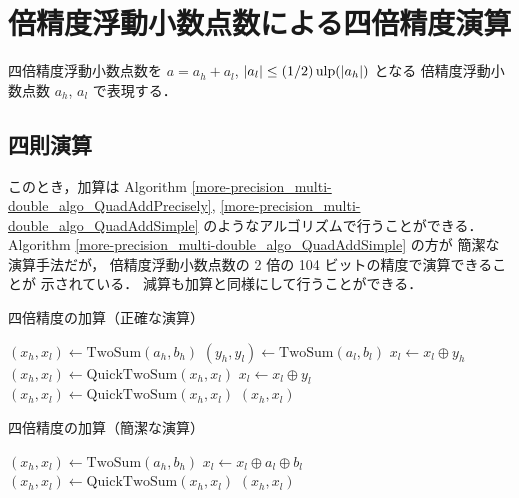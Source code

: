\clearpage

\section{倍精度浮動小数点数による四倍精度演算}

四倍精度浮動小数点数を $a = a_h + a_l$, $|a_l| \le (1/2) \operatorname{ulp}(|a_h|)$ となる
倍精度浮動小数点数 $a_h$, $a_l$ で表現する．

\subsection{四則演算}

このとき，加算は
Algorithm \ref{more-precision_multi-double_algo_QuadAddPrecisely},
\ref{more-precision_multi-double_algo_QuadAddSimple}
のようなアルゴリズムで行うことができる．
Algorithm \ref{more-precision_multi-double_algo_QuadAddSimple} の方が
簡潔な演算手法だが，
倍精度浮動小数点数の 2 倍の 104 ビットの精度で演算できることが
示されている\cite{Naoya2012}．
減算も加算と同様にして行うことができる．

\begin{algorithm}[tp]
    \caption{四倍精度の加算（正確な演算）\cite{Hisashi2006}}
    \label{more-precision_multi-double_algo_QuadAddPrecisely}
    \begin{algorithmic}[1]
        \State $(x_h, x_l) \gets \text{TwoSum}(a_h, b_h)$
        \State $(y_h, y_l) \gets \text{TwoSum}(a_l, b_l)$
        \State $x_l \gets x_l \oplus y_h$
        \State $(x_h, x_l) \gets \text{QuickTwoSum}(x_h, x_l)$
        \State $x_l \gets x_l \oplus y_l$
        \State $(x_h, x_l) \gets \text{QuickTwoSum}(x_h, x_l)$
        \State \Return $(x_h, x_l)$
        \EndProcedure
    \end{algorithmic}
\end{algorithm}

\begin{algorithm}[tp]
    \caption{四倍精度の加算（簡潔な演算）\cite{Naoya2012,Hirayama2014}}
    \label{more-precision_multi-double_algo_QuadAddSimple}
    \begin{algorithmic}[1]
        \State $(x_h, x_l) \gets \text{TwoSum}(a_h, b_h)$
        \State $x_l \gets x_l \oplus a_l \oplus b_l$
        \State $(x_h, x_l) \gets \text{QuickTwoSum}(x_h, x_l)$
        \State \Return $(x_h, x_l)$
        \EndProcedure
    \end{algorithmic}
\end{algorithm}

